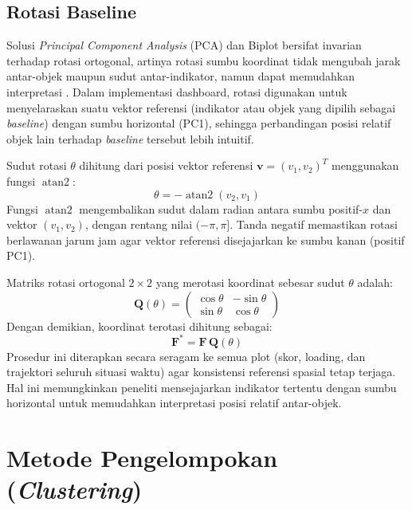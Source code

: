 \subsection{\normalsize Rotasi Baseline}

Solusi \textit{Principal Component Analysis} (PCA) dan Biplot bersifat invarian terhadap rotasi ortogonal, artinya rotasi sumbu koordinat tidak mengubah jarak antar-objek maupun sudut antar-indikator, namun dapat memudahkan interpretasi \citep{kroonenberg2008}. Dalam implementasi dashboard, rotasi digunakan untuk menyelaraskan suatu vektor referensi (indikator atau objek yang dipilih sebagai \textit{baseline}) dengan sumbu horizontal (PC1), sehingga perbandingan posisi relatif objek lain terhadap \textit{baseline} tersebut lebih intuitif.

Sudut rotasi $\theta$ dihitung dari posisi vektor referensi $\mathbf{v} = (v_1, v_2)^T$ menggunakan fungsi $\operatorname{atan2}$:
\begin{equation}
  \theta = -\operatorname{atan2}(v_2, v_1)
\end{equation}
Fungsi $\operatorname{atan2}$ mengembalikan sudut dalam radian antara sumbu positif-$x$ dan vektor $(v_1, v_2)$, dengan rentang nilai $(-\pi, \pi]$. Tanda negatif memastikan rotasi berlawanan jarum jam agar vektor referensi disejajarkan ke sumbu kanan (positif PC1).

Matriks rotasi ortogonal $2\times 2$ yang merotasi koordinat sebesar sudut $\theta$ adalah:
\begin{equation}
  \mathbf{Q}(\theta) = \begin{pmatrix} \cos\theta & -\sin\theta \\ \sin\theta & \cos\theta \end{pmatrix}
\end{equation}
Dengan demikian, koordinat terotasi dihitung sebagai:
\begin{equation}
    \mathbf{F}^* = \mathbf{F} \, \mathbf{Q}(\theta)
\end{equation}
Prosedur ini diterapkan secara seragam ke semua plot (skor, loading, dan trajektori seluruh situasi waktu) agar konsistensi referensi spasial tetap terjaga. Hal ini memungkinkan peneliti mensejajarkan indikator tertentu dengan sumbu horizontal untuk memudahkan interpretasi posisi relatif antar-objek.

\section{\normalsize Metode Pengelompokan (\textit{Clustering})}


